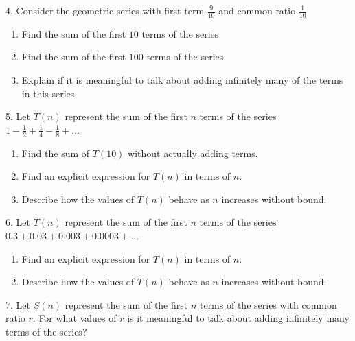 \documentclass[10pt,]{book}
\theoremstyle{plain}
\theoremstyle{definition}
\theoremstyle{definition}
\theoremstyle{definition}
\numberwithin{equation}{section}
\begin{document}
\begin{exerciselist}
\par\smallskip
\item[4.]\hypertarget{exercise-35}{}\hypertarget{p-176}{}%
Consider the geometric series with first term \(\frac{9}{10}\) and common ratio \(\frac{1}{10}\)%
\leavevmode%
\begin{enumerate}[label=(\alph*)]
\item\hypertarget{li-75}{}Find the sum of the first \(10\) terms of the series%
\item\hypertarget{li-76}{}Find the sum of the first \(100\) terms of the series%
\item\hypertarget{li-77}{}Explain if it is meaningful to talk about adding infinitely many of the terms in this series%
\end{enumerate}
\par\smallskip
\item[5.]\hypertarget{exercise-36}{}\hypertarget{p-177}{}%
Let \(T(n)\) represent the sum of the first \(n\) terms of the series \(1 - \frac{1}{2} + \frac{1}{4} - \frac{1}{8} + ...\)%
\leavevmode%
\begin{enumerate}[label=(\alph*)]
\item\hypertarget{li-78}{}Find the sum of \(T(10)\) without actually adding terms.%
\item\hypertarget{li-79}{}Find an explicit expression for \(T(n)\) in terms of \(n\).%
\item\hypertarget{li-80}{}Describe how the values of \(T(n)\) behave as \(n\) increases without bound.%
\end{enumerate}
\par\smallskip
\item[6.]\hypertarget{exercise-37}{}\hypertarget{p-178}{}%
Let \(T(n)\) represent the sum of the first \(n\) terms of the series \(0.3 + 0.03 + 0.003 + 0.0003 + ...\)%
\leavevmode%
\begin{enumerate}[label=(\alph*)]
\item\hypertarget{li-81}{}Find an explicit expression for \(T(n)\) in terms of \(n\).%
\item\hypertarget{li-82}{}Describe how the values of \(T(n)\) behave as \(n\) increases without bound.%
\end{enumerate}
\par\smallskip
\item[7.]\hypertarget{exercise-38}{}\hypertarget{p-179}{}%
Let \(S(n)\) represent the sum of the first \(n\) terms of the series with common ratio \(r\). For what values of \(r\) is it meaningful to talk about adding infinitely many terms of the series?%

\end{exerciselist}
\end{document}
